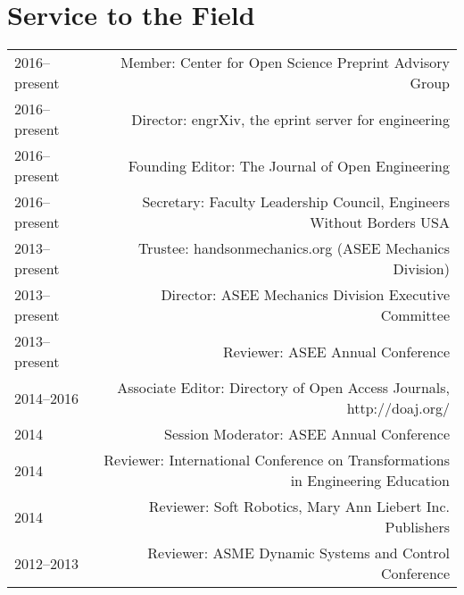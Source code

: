 \section*{Service to the Field}
\begin{tabular}{L!{\VRule}R}
2016--present&Member: Center for Open Science Preprint Advisory Group\\
2016--present&Director: engrXiv, the eprint server for engineering\\
2016--present&Founding Editor: The Journal of Open Engineering\\
2016--present&Secretary: Faculty Leadership Council, Engineers Without Borders USA\\
2013--present&Trustee: handsonmechanics.org (ASEE Mechanics Division)\\
2013--present&Director: ASEE Mechanics Division Executive Committee\\
2013--present&Reviewer: ASEE Annual Conference\\
2014--2016&Associate Editor: Directory of Open Access Journals, http://doaj.org/\\
2014&Session Moderator: ASEE Annual Conference\\
2014&Reviewer: International Conference on Transformations in Engineering Education\\
2014&Reviewer: Soft Robotics, Mary Ann Liebert Inc. Publishers\\
2012--2013&Reviewer: ASME Dynamic Systems and Control Conference\\
\end{tabular}